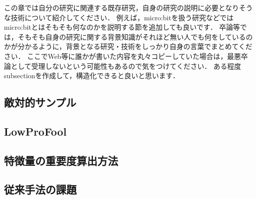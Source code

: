 この章では自分の研究に関連する既存研究，自身の研究の説明に必要となりそうな技術について紹介してください．
例えば，micro:bitを扱う研究などではmicro:bitとはそもそも何なのかを説明する節を追加しても良いです．
卒論等では，そもそも自身の研究に関する背景知識がそれほど無い人でも何をしているのかが分かるように，背景となる研究・技術をしっかり自身の言葉でまとめてください．
ここでWeb等に誰かが書いた内容を丸々コピーしていた場合は，最悪卒論として受理しないという可能性もあるので気をつけてください．
ある程度subsectionを作成して，構造化できると良いと思います．

\subsection{敵対的サンプル}

\subsection{LowProFool}

\subsection{特徴量の重要度算出方法}

\subsection{従来手法の課題}